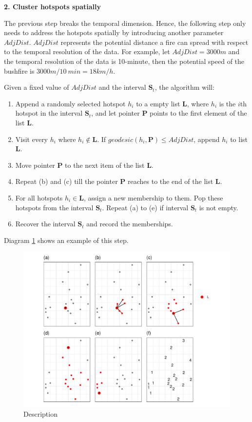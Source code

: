 \textbf{2. Cluster hotspots spatially}

The previous step breaks the temporal dimension. Hence, the following
step only needs to address the hotspots spatially by introducing another
parameter \(AdjDist\). \(AdjDist\) represents the potential distance a
fire can spread with respect to the temporal resolution of the data. For
example, let \(AdjDist = 3000 m\) and the temporal resolution of the
data is 10-minute, then the potential speed of the bushfire is
\(3000m/10~min = 18km/h\).

Given a fixed value of \(AdjDist\) and the interval
\(\boldsymbol{S}_t\), the algorithm will:

\begin{enumerate}
\def\labelenumi{(\alph{enumi})}
\item
  Append a randomly selected hotspot \(h_i\) to a empty list
  \(\boldsymbol{L}\), where \(h_i\) is the \(i\)th hotspot in the
  interval \(\boldsymbol{S}_t\), and let pointer \(\boldsymbol{P}\)
  points to the first element of the list \(\boldsymbol{L}\).
\item
  Visit every \(h_i\) where \(h_i \notin \boldsymbol{L}\). If
  \(geodesic(h_i, \boldsymbol{P})\leq AdjDist\), append \(h_i\) to list
  \(\boldsymbol{L}\).
\item
  Move pointer \(\boldsymbol{P}\) to the next item of the list
  \(\boldsymbol{L}\).
\item
  Repeat (b) and (c) till the pointer \(\boldsymbol{P}\) reaches to the
  end of the list \(\boldsymbol{L}\).
\item
  For all hotspots \(h_i \in \boldsymbol{L}\), assign a new membership
  to them. Pop these hotspots from the interval \(\boldsymbol{S}_t\).
  Repeat (a) to (e) if interval \(\boldsymbol{S}_t\) is not empty.
\item
  Recover the interval \(\boldsymbol{S}_t\) and record the memberships.
\end{enumerate}

Diagram \ref{fig:step2figs} shows an example of this step.

\begin{Schunk}
\begin{figure}
\includegraphics[width=0.8\linewidth]{clustering_paper_files/figure-latex/step2figs-1} \caption[Description]{Description}\label{fig:step2figs}
\end{figure}
\end{Schunk}

